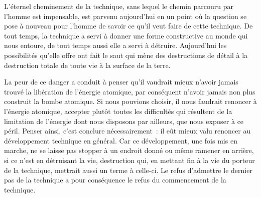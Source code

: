 
{L'éternel cheminement de la technique, sans lequel le chemin parcouru par l'homme est impensable, est parvenu aujourd'hui en un point où la question se pose à nouveau pour l'homme de savoir ce qu'il veut faire de cette technique. De tout temps, la technique a servi à donner une forme constructive au monde qui nous entoure, de tout temps aussi elle a servi à détruire. Aujourd'hui les possibilités qu'elle offre ont fait le saut qui mène des destructions de détail à la destruction totale de toute vie à la surface de la terre.

La peur de ce danger a conduit à penser qu'il vaudrait mieux n'avoir jamais trouvé la libération de l'énergie atomique, par conséquent n'avoir jamais non plus construit la bombe atomique. Si nous pouvions choisir, il nous faudrait renoncer à l'énergie atomique, accepter plutôt toutes les difficultés qui résultent de la limitation de l'énergie dont nous disposons par ailleurs, que nous exposer à ce péril. Penser ainsi, c'est conclure nécessairement~: il eût mieux valu renoncer au développement technique en général. Car ce développement, une fois mis en marche, ne se laisse pas stopper à un endroit donné ou même ramener en arrière, si ce n'est en détruisant la vie, destruction qui, en mettant fin à la vie du porteur de la technique, mettrait aussi un terme à celle-ci. Le refus d'admettre le dernier pas de la technique a pour conséquence le refus du commencement de la technique.
}



